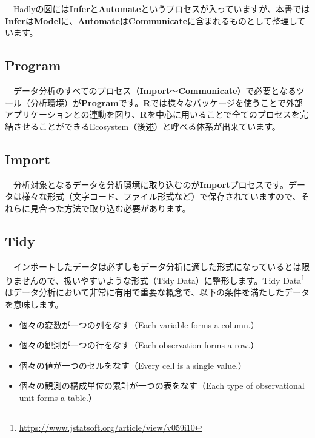 \documentclass[
  12pt,
]{book}
\DeclareRobustCommand{\href}[2]{#2\footnote{\url{#1}}}
\providecommand{\tightlist}{%
  \setlength{\itemsep}{0pt}\setlength{\parskip}{0pt}}
\begin{document}
　Hadlyの図には\textbf{Infer}と\textbf{Automate}というプロセスが入っていますが、本書では\textbf{Infer}は\textbf{Model}に、\textbf{Automate}は\textbf{Communicate}に含まれるものとして整理しています。

\hypertarget{program}{%
\subsection*{Program}\label{program}}

　データ分析のすべてのプロセス（\textbf{Import}〜\textbf{Communicate}）で必要となるツール（分析環境）が\textbf{Program}です。\textbf{R}では様々なパッケージを使うことで外部アプリケーションとの連動を図り、\textbf{R}を中心に用いることで全てのプロセスを完結させることができるEcosystem（後述）と呼べる体系が出来ています。

\hypertarget{import}{%
\subsection*{Import}\label{import}}

　分析対象となるデータを分析環境に取り込むのが\textbf{Import}プロセスです。データは様々な形式（文字コード、ファイル形式など）で保存されていますので、それらに見合った方法で取り込む必要があります。

\newpage

\hypertarget{tidy}{%
\subsection*{Tidy}\label{tidy}}

　インポートしたデータは必ずしもデータ分析に適した形式になっているとは限りませんので、扱いやすいような形式（Tidy Data）に整形します。\href{https://www.jstatsoft.org/article/view/v059i10}{Tidy Data}\citep{R-TidyData}はデータ分析において非常に有用で重要な概念で、以下の条件を満たしたデータを意味します。

\begin{itemize}
\tightlist
\item
  個々の変数が一つの列をなす（Each variable forms a column.）
\item
  個々の観測が一つの行をなす（Each observation forms a row.）
\item
  個々の値が一つのセルをなす（Every cell is a single value.）
\item
  個々の観測の構成単位の累計が一つの表をなす（Each type of observational unit forms a table.）
\end{itemize}
\end{document}
